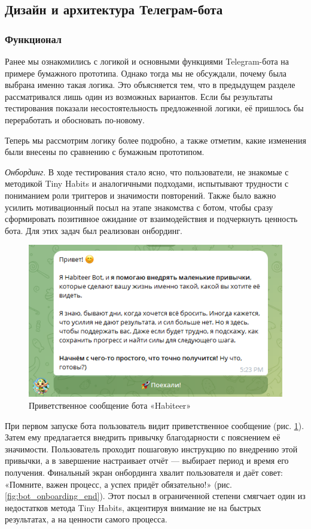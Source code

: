 \documentclass[pdflatex,sn-mathphys-num]{sn-jnl}%
\theoremstyle{thmstyleone}%
\theoremstyle{thmstyletwo}%
\theoremstyle{thmstylethree}%
\begin{document}
\subsection{Дизайн и архитектура Телеграм-бота}

\subsubsection{Функционал}

Ранее мы ознакомились с логикой и основными функциями Telegram-бота на примере бумажного прототипа. Однако тогда мы не обсуждали, почему была выбрана именно такая логика. Это объясняется тем, что в предыдущем разделе рассматривался лишь один из возможных вариантов. Если бы результаты тестирования показали несостоятельность предложенной логики, её пришлось бы переработать и обосновать по-новому.

Теперь мы рассмотрим логику более подробно, а также отметим, какие изменения были внесены по сравнению с бумажным прототипом.

\textit{Онбординг}. В ходе тестирования стало ясно, что пользователи, не знакомые с методикой Tiny Habits и аналогичными подходами, испытывают трудности с пониманием роли триггеров и значимости повторений. Также было важно усилить мотивационный посыл на этапе знакомства с ботом, чтобы сразу сформировать позитивное ожидание от взаимодействия и подчеркнуть ценность бота. Для этих задач был реализован онбординг.

\begin{figure}
    \centering
    \includegraphics[width=0.6\linewidth]{figures/bot_first_message.png}
    \caption{Приветственное сообщение бота «Habiteer»}
    \label{fig:bot_first_message}
\end{figure}

При первом запуске бота пользователь видит приветственное сообщение (рис. \ref{fig:bot_first_message}). Затем ему предлагается внедрить привычку благодарности с пояснением её значимости. Пользователь проходит пошаговую инструкцию по внедрению этой привычки, а в завершение настраивает отчёт — выбирает период и время его получения. Финальный экран онбординга хвалит пользователя и даёт совет: «Помните, важен процесс, а успех придёт обязательно!» (рис. \ref{fig:bot_onboarding_end}). Этот посыл в ограниченной степени смягчает один из недостатков метода Tiny Habits, акцентируя внимание не на быстрых результатах, а на ценности самого процесса.
\end{document}
